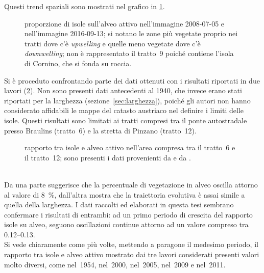 Questi trend spaziali sono mostrati nel grafico in \cref{graph:rapp-isl-2008-2016}.
%
\begin{figure}
	\centering
	
	\caption[proporzione di isole sull'alveo attivo nel 2008-07-05 e nel 2016-09-13]{proporzione di isole sull'alveo attivo nell'immagine \AST{} 2008-07-05 e nell'immagine \Se{} 2016-09-13; si notano le zone più vegetate proprio nei tratti dove c'è \emph{upwelling} e quelle meno vegetate dove c'è \emph{downwelling}; non è rappresentato il tratto~9 poiché contiene l'isola di Cornino, che si fonda su roccia.}
	\label{graph:rapp-isl-2008-2016}
\end{figure}
%

Si è proceduto confrontando parte dei dati ottenuti con i risultati riportati in due lavori  (\cref{graph:rapp-isl-vs-letteratura}).
Non sono presenti dati antecedenti al 1940, che invece erano stati riportati per la larghezza (sezione~\ref{sec:larghezza}), poiché gli autori non hanno considerato affidabili le mappe del catasto austriaco nel definire i limiti delle isole.
Questi risultati sono limitati ai tratti compresi tra il ponte autostradale presso Braulins (tratto~6) e la stretta di Pinzano (tratto~12).
%
\begin{figure}
	\centering
	
	\caption[rapporto tra isole e alveo attivo nell'area compresa tra il tratto~6 e il tratto~12]{rapporto tra isole e alveo attivo nell'area compresa tra il tratto~6 e il tratto~12; sono presenti i dati provenienti da  e da .}
	\label{graph:rapp-isl-vs-letteratura}
\end{figure}
%
\\
Da una parte  suggerisce che la percentuale di vegetazione in alveo oscilla attorno al valore di \SI{8}{\percent}, dall'altra  mostra che la traiettoria evolutiva è assai simile a quella della larghezza.
I dati raccolti ed elaborati in questa tesi sembrano confermare i risultati di entrambi: ad un primo periodo di crescita del rapporto isole su alveo, seguono oscillazioni continue attorno ad un valore compreso tra \numrange[range-phrase={ e }]{0.12}{0.13}.
\\
Si vede chiaramente come più volte, mettendo a paragone il medesimo periodo, il rapporto tra isole e alveo attivo mostrato dai tre lavori considerati presenti valori molto diversi, come nel~1954, nel~2000, nel~2005, nel~2009 e nel~2011.
